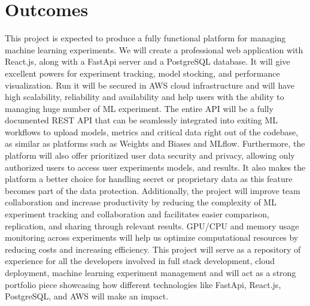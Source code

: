 \documentclass[12pt]{article}
\begin{document}
\section{Outcomes}
This project is expected to produce a fully functional platform for managing machine learning experiments. We will create a professional web application with React.js, along with a FastApi server and a PostgreSQL database. It will give excellent powers for experiment tracking, model stocking, and performance visualization. Run it will be secured in AWS cloud infrastructure and will have high scalability, reliability and availability and help users with the ability to managing huge number of ML experiment. The entire API will be a fully documented REST API that can be seamlessly integrated into exiting ML workflows to upload models, metrics and critical data right out of the codebase, as similar as platforms such as Weights and Biases and MLflow. Furthermore, the platform will also offer prioritized user data security and privacy, allowing only authorized users to access user experiments models, and results. It also makes the platform a better choice for handling secret or proprietary data as this feature becomes part of the data protection. Additionally, the project will improve team collaboration and increase productivity by reducing the complexity of ML experiment tracking and collaboration and facilitates easier comparison, replication, and sharing through relevant results. GPU/CPU and memory usage monitoring across experiments will help us optimize computational resources by reducing costs and increasing efficiency. This project will serve as a repository of experience for all the developers involved in full stack development, cloud deployment, machine learning experiment management and will act as a strong portfolio piece showcasing how different technologies like FastApi, React.js, PostgreSQL, and AWS will make an impact.
\end{document}
